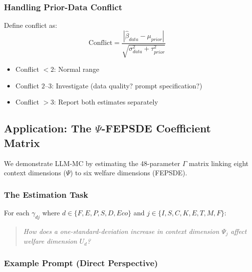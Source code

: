 \subsubsection{Handling Prior-Data Conflict}

Define conflict as:
\begin{equation}
\text{Conflict} = \frac{|\hat{\beta}_{data} - \mu_{prior}|}{\sqrt{\sigma^2_{data} + \tau^2_{prior}}}
\end{equation}

\begin{itemize}
    \item Conflict $< 2$: Normal range
    \item Conflict $2$--$3$: Investigate (data quality? prompt specification?)
    \item Conflict $> 3$: Report both estimates separately
\end{itemize}

\subsection{Application: The $\Psi$-FEPSDE Coefficient Matrix}

We demonstrate LLM-MC by estimating the 48-parameter $\Gamma$ matrix linking eight context dimensions ($\Psi$) to six welfare dimensions (FEPSDE).

\subsubsection{The Estimation Task}

For each $\gamma_{dj}$ where $d \in \{F, E, P, S, D, Eco\}$ and $j \in \{I, S, C, K, E, T, M, F\}$:

\begin{quote}
\textit{How does a one-standard-deviation increase in context dimension $\Psi_j$ affect welfare dimension $U_d$?}
\end{quote}

\subsubsection{Example Prompt (Direct Perspective)}

